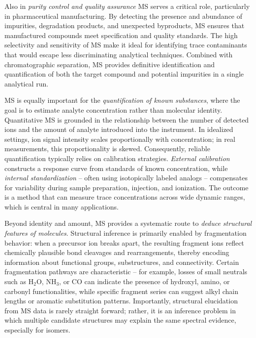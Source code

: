 Also in \emph{purity control and quality assurance} MS serves a critical role, particularly in pharmaceutical manufacturing. 
By detecting the presence and abundance of impurities, degradation products, and unexpected byproducts, MS ensures that manufactured compounds meet specification and quality standards. 
The high selectivity and sensitivity of MS make it ideal for identifying trace contaminants that would escape less discriminating analytical techniques. Combined with chromatographic separation, MS provides definitive identification and quantification of both the target compound and potential impurities in a single analytical run. \cite[p.~2]{Rambhad2025}

MS is equally important for the \emph{quantification of known substances}, where the goal is to estimate analyte concentration rather than molecular identity. \cite[p.~260]{Hoffmann2011}
Quantitative MS is grounded in the relationship between the number of detected ions and the amount of analyte introduced into the instrument. \cite[p.~261 \& 265-266]{Hoffmann2011}
In idealized settings, ion signal intensity scales proportionally with concentration; in real measurements, this proportionality is skewed.
Consequently, reliable quantification typically relies on calibration strategies. 
\emph{External calibration} constructs a response curve from standards of known concentration, while \emph{internal standardization} -- often using isotopically labeled analogs -- compensates for variability during sample preparation, injection, and ionization. \cite[p.~264-268]{Hoffmann2011}
The outcome is a method that can measure trace concentrations across wide dynamic ranges, which is central in many applications.

Beyond identity and amount, MS provides a systematic route to \emph{deduce structural features of molecules}. 
Structural inference is primarily enabled by fragmentation behavior: when a precursor ion breaks apart, the resulting fragment ions reflect chemically plausible bond cleavages and rearrangements, thereby encoding information about functional groups, substructures, and connectivity.  \cite[p.~i49]{Boecker2008}
Certain fragmentation pathways are characteristic  -- for example, losses of small neutrals such as $\mathrm{H_2O}$, $\mathrm{NH_3}$, or $\mathrm{CO}$ can indicate the presence of hydroxyl, amino, or carbonyl functionalities, while specific fragment series can suggest alkyl chain lengths or aromatic substitution patterns. \cite[p.~504]{Gross2006} 
Importantly, structural elucidation from MS data is rarely straight forward; 
rather, it is an inference problem in which multiple candidate structures may explain the same spectral evidence, especially for isomers. \cite[p.~53]{Vaniya2015}

